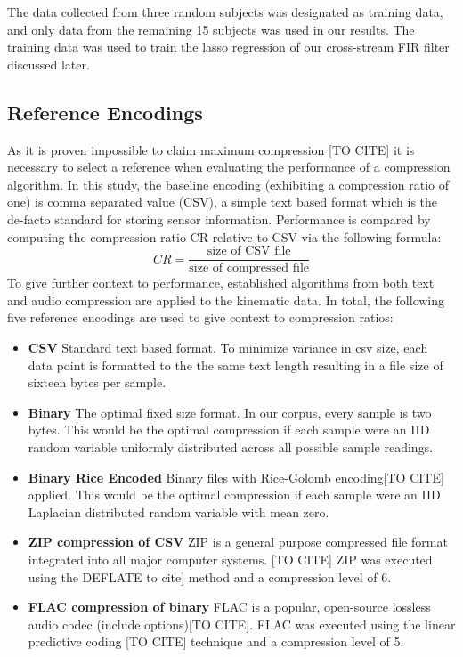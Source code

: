 \documentclass[journal]{IEEEtran}
\begin{document}
The data collected from three random subjects was designated as training data, and only data from the remaining 15 subjects was used in our results. The training data was used to train the lasso regression of our cross-stream FIR filter discussed later.



\subsection{Reference Encodings}
As it is proven impossible to claim maximum compression [TO CITE] it is necessary to select a reference when evaluating the performance of a compression algorithm. In this study, the baseline encoding (exhibiting a compression ratio of one) is comma separated value (CSV), a simple text based format which is the de-facto standard for storing sensor information. Performance is compared by computing the compression ratio CR relative to CSV via the following formula:
$$CR = \frac{\textrm{size of CSV file}}{\textrm{size of compressed file}}$$
To give further context to performance, established algorithms from both text and audio compression are applied to the kinematic data. In total, the following five reference encodings are used to give context to compression ratios:

\begin{itemize}
  \item \textbf{CSV} Standard text based format. To minimize variance in csv size, each data point is formatted to the the same text length resulting in a file size of sixteen bytes per sample.
  \item \textbf{Binary} The optimal fixed size format. In our corpus, every sample is two bytes. This would be the optimal compression if each sample were an IID random variable uniformly distributed across all possible sample readings.
  \item \textbf{Binary Rice Encoded} Binary files with Rice-Golomb encoding[TO CITE] applied. This would be the optimal compression if each sample were an IID Laplacian distributed random variable with mean zero.
  \item \textbf{ZIP compression of CSV} ZIP is a general purpose compressed file format integrated into all major computer systems. [TO CITE] ZIP was executed using the DEFLATE to cite] method and a compression level of 6.
  \item \textbf{FLAC compression of binary} FLAC is a popular, open-source lossless audio codec (include options)[TO CITE]. FLAC was executed using the linear predictive coding [TO CITE] technique and a compression level of 5.
\end{itemize}
\end{document}
